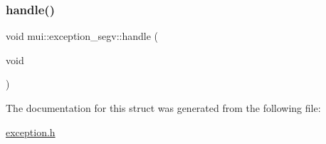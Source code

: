 \mbox{\label{structmui_1_1exception__segv_a9a4e64bfd3ff46807c92706be20ce3fa}} 
\subsubsection{\texorpdfstring{handle()}{handle()}\hspace{0.1cm}{\footnotesize\ttfamily [2/2]}}
{\footnotesize\ttfamily void mui\+::exception\+\_\+segv\+::handle (\begin{DoxyParamCaption}\item[{void}]{ }\end{DoxyParamCaption})\hspace{0.3cm}{\ttfamily [inline]}}



The documentation for this struct was generated from the following file\+:\begin{DoxyCompactItemize}
\item 
\hyperlink{exception_8h}{exception.\+h}\end{DoxyCompactItemize}
